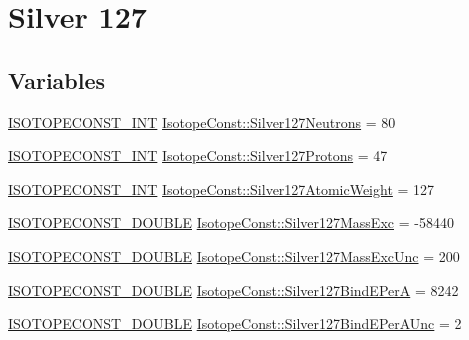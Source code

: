 \hypertarget{group___isotope_const-_silver-_ag127}{}\section{Silver 127}
\label{group___isotope_const-_silver-_ag127}
\subsection*{Variables}
\begin{DoxyCompactItemize}
\item 
\mbox{\hyperlink{group___isotope_const-_macros_ga5f18360b3e99483a35c32d789e62621c}{I\+S\+O\+T\+O\+P\+E\+C\+O\+N\+S\+T\+\_\+\+I\+NT}} \mbox{\hyperlink{group___isotope_const-_silver-_ag127_ga25c19509cf5772261e20314544dbc42f}{Isotope\+Const\+::\+Silver127\+Neutrons}} = 80
\item 
\mbox{\hyperlink{group___isotope_const-_macros_ga5f18360b3e99483a35c32d789e62621c}{I\+S\+O\+T\+O\+P\+E\+C\+O\+N\+S\+T\+\_\+\+I\+NT}} \mbox{\hyperlink{group___isotope_const-_silver-_ag127_ga0e123f13df7d328e53741d565f07c18b}{Isotope\+Const\+::\+Silver127\+Protons}} = 47
\item 
\mbox{\hyperlink{group___isotope_const-_macros_ga5f18360b3e99483a35c32d789e62621c}{I\+S\+O\+T\+O\+P\+E\+C\+O\+N\+S\+T\+\_\+\+I\+NT}} \mbox{\hyperlink{group___isotope_const-_silver-_ag127_ga75b469c951db19b9e0f9d27b492e00df}{Isotope\+Const\+::\+Silver127\+Atomic\+Weight}} = 127
\item 
\mbox{\hyperlink{group___isotope_const-_macros_ga8f45a7272ce02c0b4c65c44636ed719a}{I\+S\+O\+T\+O\+P\+E\+C\+O\+N\+S\+T\+\_\+\+D\+O\+U\+B\+LE}} \mbox{\hyperlink{group___isotope_const-_silver-_ag127_ga0e10e4aeaa2b0d4522840549bac00e8b}{Isotope\+Const\+::\+Silver127\+Mass\+Exc}} = -\/58440
\item 
\mbox{\hyperlink{group___isotope_const-_macros_ga8f45a7272ce02c0b4c65c44636ed719a}{I\+S\+O\+T\+O\+P\+E\+C\+O\+N\+S\+T\+\_\+\+D\+O\+U\+B\+LE}} \mbox{\hyperlink{group___isotope_const-_silver-_ag127_gaeec1e73fd0580f97546a25c12ed08f87}{Isotope\+Const\+::\+Silver127\+Mass\+Exc\+Unc}} = 200
\item 
\mbox{\hyperlink{group___isotope_const-_macros_ga8f45a7272ce02c0b4c65c44636ed719a}{I\+S\+O\+T\+O\+P\+E\+C\+O\+N\+S\+T\+\_\+\+D\+O\+U\+B\+LE}} \mbox{\hyperlink{group___isotope_const-_silver-_ag127_ga7616d4f6c24e903ca5dc8986c540215e}{Isotope\+Const\+::\+Silver127\+Bind\+E\+PerA}} = 8242
\item 
\mbox{\hyperlink{group___isotope_const-_macros_ga8f45a7272ce02c0b4c65c44636ed719a}{I\+S\+O\+T\+O\+P\+E\+C\+O\+N\+S\+T\+\_\+\+D\+O\+U\+B\+LE}} \mbox{\hyperlink{group___isotope_const-_silver-_ag127_gab3543b683e00f1cb4c6c284484910e8e}{Isotope\+Const\+::\+Silver127\+Bind\+E\+Per\+A\+Unc}} = 2

\end{DoxyCompactItemize}
